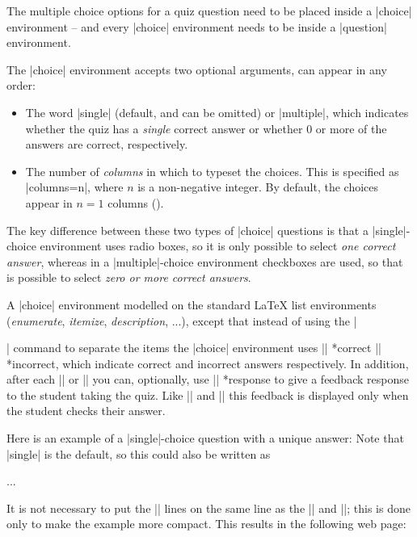 \documentclass[svgnames]{article}
\begin{document}
  The multiple choice options for a quiz question need to be placed inside
  a \LatexCode|choice| environment -- and every \LatexCode|choice|
  environment needs to be inside a \LatexCode|question| environment.

  The \LatexCode|choice| environment accepts two optional arguments,
  can appear in any order:
  \begin{itemize}
    \item{}
    The word \LatexCode|single| (default, and can be omitted) or
    \LatexCode|multiple|, which indicates whether the quiz has a
    \textit{single} correct answer or whether 0 or more of the answers are
    correct, respectively.
    \item {}
    The number of \textit{columns} in which to typeset the choices. This
    is specified as \LatexCode|columns=n|, where $n$ is a non-negative integer.
    By default, the choices appear in $n=1$ columns
    ().
  \end{itemize}
  The key difference between these two types of \LatexCode|choice|
  questions is that a \LatexCode|single|-choice environment uses radio
  boxes, so it is only possible to select \textit{one correct answer}, whereas in a
  \LatexCode|multiple|-choice environment checkboxes are used, so that is
  possible to select \textit{zero or more correct answers}.

  A \LatexCode|choice| environment modelled on the standard
  \LaTeX{} list environments (\textit{enumerate}, \textit{itemize},
  \textit{description}, ...), except that instead of using the
  \LatexCode|\item| command to separate the items the
  \LatexCode|choice| environment uses \LatexCode|\correct|
  *{correct} \LatexCode|\incorrect|
  *{incorrect}, which indicate correct
  and incorrect answers respectively.  In addition, after each
  \LatexCode|\correct| or \LatexCode|\incorrect| you can, optionally, use
  \LatexCode|\response| *{response} to give
  a feedback response to the student taking the quiz. Like
  \LatexCode|\whenRight| and \LatexCode|\whenWrong| this feedback is
  displayed only when the student checks their answer.

  Here is an example of a \LatexCode|single|-choice question with a unique
  answer:
  Note that \LatexCode|single| is the default, so this could also be written as
  \begin{latexcode}
    \begin{choice}[columns=3, single]
      ...
    \end{choice}
  \end{latexcode}
  It is not necessary to put the \LatexCode|\response| lines on the same
  line as the \LatexCode|\incorrect| and \LatexCode|\incorrect|; this is
  done only to make the example more compact. This results in the
  following web page:
\end{document}

